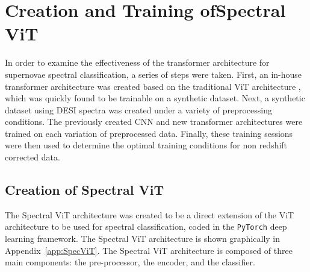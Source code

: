 \chapter[Creation and Training of Spectral ViT]{Creation and Training of\newline Spectral ViT}
\label{chap:methods}

In order to examine the effectiveness of the transformer architecture for supernovae
spectral classification, a series of steps were taken. First, an in-house transformer 
architecture was created based on the traditional ViT architecture \cite{dosovitskiy2020}, 
which was quickly found to be trainable on a synthetic dataset. Next, a synthetic dataset 
using DESI spectra was created under a variety of preprocessing conditions. The previously 
created CNN and new transformer architectures were trained on each variation of 
preprocessed data. Finally, these training sessions were then used to determine 
the optimal training conditions for non redshift corrected data. 
\section{Creation of Spectral ViT}\label{sec:SpecViT}
The Spectral ViT architecture was created to be a direct extension of the ViT architecture
\cite{dosovitskiy2020} to be used for spectral classification, coded in the \texttt{PyTorch}
deep learning framework. The Spectral ViT architecture is shown graphically in
Appendix~\ref{app:SpecViT}. The Spectral ViT architecture is
composed of three main components: the pre-processor, the encoder, and the classifier. 

